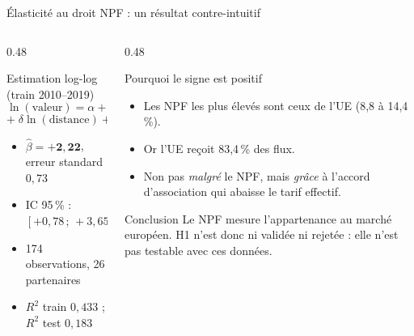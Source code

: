 \documentclass[aspectratio=169,10pt]{beamer}
\begin{document}
\begin{frame}{Élasticité au droit NPF : un résultat contre-intuitif}
  \begin{columns}[T,onlytextwidth]
    \begin{column}{0.48\textwidth}
      \begin{block}{Estimation log-log (train 2010--2019)}
        {\small
        \[
          \ln(\text{valeur}) = \alpha + \beta\ln(\text{NPF})
          + \gamma\ln(\text{PIB})
        \]
        \[
          +\; \delta\ln(\text{distance}) + \varepsilon
        \]
        }
        \begin{itemize}
          \item $\hat{\beta} = \mathbf{+2{,}22}$, erreur standard $0{,}73$
          \item IC 95\,\% : $[+0{,}78\,;\,+3{,}65]$
          \item 174 observations, 26 partenaires
          \item $R^2$ train $0{,}433$ ; $R^2$ test $0{,}183$
        \end{itemize}
      \end{block}
    \end{column}
    \begin{column}{0.48\textwidth}
      \begin{block}{Pourquoi le signe est positif}
        \begin{itemize}
          \item Les NPF les plus élevés sont ceux de l'UE
                (8,8 à 14,4\,\%).
          \item Or l'UE reçoit 83,4\,\% des flux.
          \item Non pas \emph{malgré} le NPF, mais \emph{grâce} à l'accord
                d'association qui abaisse le tarif effectif.
        \end{itemize}
      \end{block}
      \begin{block}{Conclusion}
        Le NPF mesure l'appartenance au marché européen. H1 n'est donc ni
        validée ni rejetée : elle n'est pas testable avec ces données.
      \end{block}
    \end{column}
  \end{columns}
\end{frame}
\end{document}

